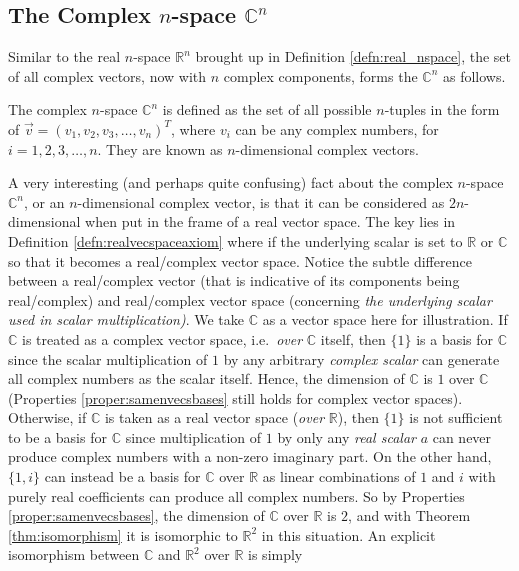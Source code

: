 \subsection{The Complex $n$-space $\mathbb{C}^n$}

Similar to the real $n$-space $\mathbb{R}^n$ brought up in Definition \ref{defn:real_nspace}, the set of all complex vectors, now with $n$ complex components, forms the  $\mathbb{C}^n$ as follows.
\begin{defn}
\label{defn:complex_nspace}
The complex $n$-space $\mathbb{C}^n$ is defined as the set of all possible $n$-tuples in the form of $\vec{v} = (v_1, v_2, v_3, \ldots, v_n)^T$, where $v_i$ can be any complex numbers, for $i = 1,2,3,\ldots,n$. They are known as $n$-dimensional complex vectors.
\end{defn}
A very interesting (and perhaps quite confusing) fact about the complex $n$-space $\mathbb{C}^n$, or an $n$-dimensional complex vector, is that it can be considered as $2n$-dimensional when put in the frame of a real vector space. The key lies in Definition \ref{defn:realvecspaceaxiom} where if the underlying scalar is set to $\mathbb{R}$ or $\mathbb{C}$ so that it becomes a real/complex vector space. Notice the subtle difference between a real/complex vector (that is indicative of its components being real/complex) and real/complex vector space (concerning \textit{the underlying scalar used in scalar multiplication)}. We take $\mathbb{C}$ as a vector space here for illustration. If $\mathbb{C}$ is treated as a complex vector space, i.e.\ \textit{over} $\mathbb{C}$ itself, then $\{1\}$ is a basis for $\mathbb{C}$ since the scalar multiplication of $1$ by any arbitrary \textit{complex scalar} can generate all complex numbers as the scalar itself. Hence, the dimension of $\mathbb{C}$ is $1$ over $\mathbb{C}$ (Properties \ref{proper:samenvecsbases} still holds for complex vector spaces). Otherwise, if $\mathbb{C}$ is taken as a real vector space (\textit{over} $\mathbb{R}$), then $\{1\}$ is not sufficient to be a basis for $\mathbb{C}$ since multiplication of $1$ by only any \textit{real scalar} $a$ can never produce complex numbers with a non-zero imaginary part. On the other hand, $\{1, i\}$ can instead be a basis for $\mathbb{C}$ over $\mathbb{R}$ as linear combinations of $1$ and $i$ with purely real coefficients can produce all complex numbers. So by Properties \ref{proper:samenvecsbases}, the dimension of $\mathbb{C}$ over $\mathbb{R}$ is $2$, and with Theorem \ref{thm:isomorphism} it is isomorphic to $\mathbb{R}^2$ in this situation. An explicit isomorphism between $\mathbb{C}$ and $\mathbb{R}^2$ over $\mathbb{R}$ is simply
